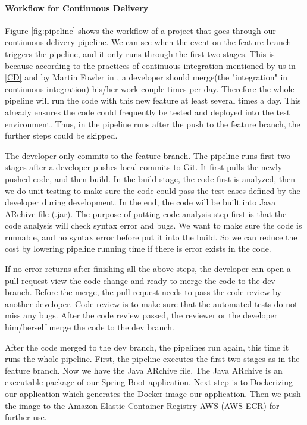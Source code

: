 \paragraph[]{Workflow for Continuous Delivery}
Figure \ref{fig:pipeline} shows the workflow of a project that goes through our continuous delivery pipeline.
We can see when the event on the feature branch triggers the pipeline, and it only runs through the first two stages. This is because according to the practices of continuous integration mentioned by us in \ref{CD} and by Martin Fowler in \cite{fowler2006continuous}, a developer should merge(the "integration" in continuous integration) his/her work couple times per day. Therefore the whole pipeline will run the code with this new feature at least several times a day. This already ensures the code could frequently be tested and deployed into the test environment. Thus, in the pipeline runs after the push to the feature branch, the further steps could be skipped. 
\par
 The developer only commits to the feature branch. The pipeline runs first two stages after a developer pushes local commits to Git. It first pulls the newly pushed code, and then build. In the build stage, the code first is analyzed, then we do unit testing to make sure the code could pass the test cases defined by the developer during development. In the end, the code will be built into Java ARchive file (.jar). The purpose of putting code analysis step first is that the code analysis will check syntax error and bugs. We want to make sure the code is runnable, and no syntax error before put it into the build. So we can reduce the cost by lowering pipeline running time if there is error exists in the code. 
\par
If no error returns after finishing all the above steps, the developer can open a pull request view the code change and ready to merge the code to the dev branch. Before the merge, the pull request needs to pass the code review by another developer. Code review is to make sure that the automated tests do not miss any bugs. After the code review passed, the reviewer or the developer him/herself merge the code to the dev branch.  
\par
After the code merged to the dev branch, the pipelines run again, this time it runs the whole pipeline. First, the pipeline executes the first two stages as in the feature branch. Now we have the Java ARchive file. The Java ARchive is an executable package of our Spring Boot application. Next step is to Dockerizing our application which generates the Docker image our application. Then we push the image to the Amazon Elastic Container Registry AWS (AWS ECR) for further use.
